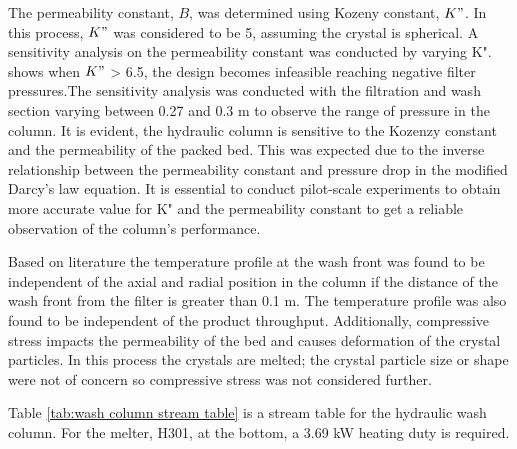 The permeability constant, $B$, was determined using Kozeny constant, $K"$.  In this process, $K"$ was considered to be 5, assuming the crystal is spherical. A sensitivity analysis on the permeability constant was conducted by varying K".  shows when $K"$ > 6.5, the design becomes infeasible reaching negative filter pressures.The sensitivity analysis was conducted with the filtration and wash section varying between 0.27 and 0.3 m to observe the range of pressure in the column. It is evident, the hydraulic column is sensitive to the Kozenzy constant and the permeability of the packed bed. This was expected due to the inverse relationship between the permeability constant and pressure drop in the modified Darcy's law equation. It is essential to conduct pilot-scale experiments to obtain more accurate value for K" and the permeability constant to get a reliable observation of the column's performance. 

Based on literature \cite{jansens_furification_1995} the temperature profile at the wash front was found to be independent of the axial and radial position in the column if the distance of the wash front from the filter is greater than 0.1 m. The temperature profile was also found to be independent of the product throughput. Additionally, compressive stress impacts the permeability of the bed and causes deformation of the crystal particles. In this process the crystals are melted; the crystal particle size or shape were not of concern so compressive stress was not considered further. 


Table \ref{tab:wash column stream table} is a stream table for the hydraulic wash column. For the melter, H301, at the bottom, a 3.69 kW heating duty is required.  

